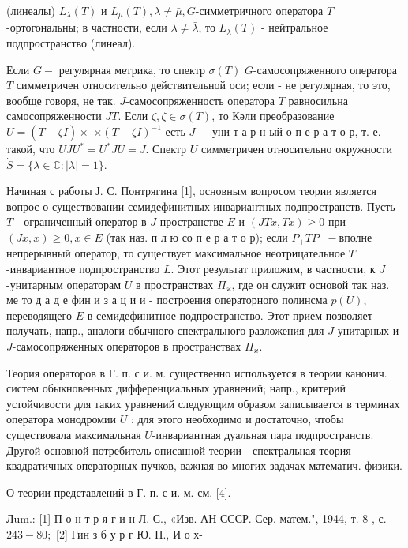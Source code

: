 \documentclass[10pt]{article}
\begin{document}
(линеалы) $L_{\lambda}(T)$ и $L_{\mu}(T), \lambda \neq \bar{\mu}, G$-симметричного оператора $T$-ортогональны; в частности, если $\lambda \neq \bar{\lambda}$, то $L_{\lambda}(T)$ - нейтральное подпространство (линеал).



Если $G-$ регулярная метрика, то спектр $\sigma(T)$ $G$-самосопряженного оператора $T$ симметричен относительно действительной оси; если - не регулярная, то это, вообще говоря, не так. $J$-самосопряженность оператора $T$ равносильна самосопряженности $J T$. Если $\zeta, \bar{\zeta} \in \sigma(T)$, то Кәли преобразование $U=(T-\overline{\zeta I}) \times$ $\times(T-\zeta I)^{-1}$ есть $J-$ уни т а р н ый о п е р а т о р, т. е. такой, что $U J U^{*}=U^{*} J U=J$. Спектр $U$ симметричен относительно окружности $\dot{S}=\{\lambda \in \mathbb{C}:|\lambda|=1\}$.



Начиная с работы Ј. С. Понтрягина [1], основным вопросом теории является вопрос о существовании семидефинитных инвариантных подпространств. Пусть $T$ - ограниченный оператор в $J$-пространстве $E$ и $(J T x, T x) \geqslant 0$ при $(J x, x) \geqslant 0, x \in E$ (так наз. п л ю со п е р а т о р); если $P_{+} T P_{-}-$вполне непрерывный оператор, то существует максимальное неотрицательное $T$-инвариантное подпространство $L$. Этот результат приложим, в частности, к $J$-унитарным операторам $U$ в пространствах $\Pi_{\varkappa}$, где он служит основой так наз. ме то д а д е фин и з а ц и и - построения операторного полинсма $p(U)$, переводящего $E$ в семидефинитное подпространство. Этот прием позволяет получать, напр., аналоги обычного спектрального разложения для $J$-унитарных и $J$-самосопряженных операторов в пространствах $\Pi_{\varkappa}$.



Теория операторов в Г. п. с и. м. существенно используется в теории канонич. систем обыкновенных дифференциальных уравнений; напр., критерий устойчивости для таких уравнений следующим образом записывается в терминах оператора монодромии $U$ : для этого необходимо и достаточно, чтобы существовала максимальная $U$-инвариантная дуальная пара подпространств. Другой основной потребитель описанной теории - спектральная теория квадратичных операторных пучков, важная во многих задачах математич. физики.



О теории представлений в Г. п. с и. м. см. [4].



Лum.: [1] П о н т р я г и н Л. С., «Изв. АН СССР. Сер. матем.", 1944, т. 8 , с. $243-80 ;$ [2] Гин з б у р г Ю. П., И о х-
\end{document}
